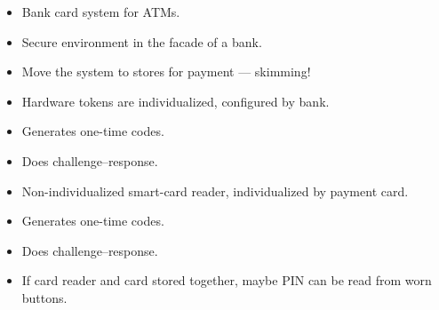 \begin{frame}
  \begin{example}
    \begin{itemize}
      \item Bank card system for ATMs.
      \item Secure environment in the facade of a bank.
      \item Move the system to stores for payment --- skimming!
    \end{itemize}
  \end{example}
\end{frame}

\begin{frame}
  \begin{example}
    \begin{itemize}
      \item Hardware tokens are individualized, configured by bank.
      \item Generates one-time codes.
      \item Does challenge--response.
    \end{itemize}
  \end{example}

  \pause

  \begin{example}
    \begin{itemize}
      \item Non-individualized smart-card reader, individualized by payment 
        card.
      \item Generates one-time codes.
      \item Does challenge--response.
    \end{itemize}
  \end{example}
\end{frame}

\begin{frame}
  \begin{remark}
    \begin{itemize}
      \item If card reader and card stored together, maybe PIN can be read from 
        worn buttons.
    \end{itemize}
  \end{remark}
\end{frame}

